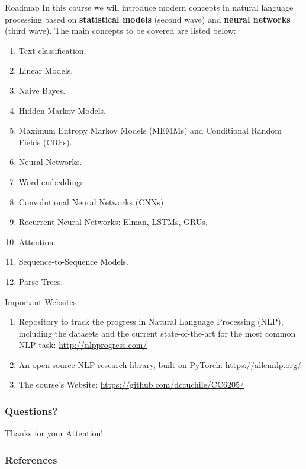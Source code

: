 \documentclass[handout]{beamer}
\begin{document}
\begin{frame}{Roadmap}
In this course we will introduce modern concepts in natural language processing based on \textbf{statistical models} (second wave) and \textbf{neural networks} (third wave). The main concepts to be covered are listed below:
\begin{scriptsize}
\begin{enumerate}
\item Text classification.
\item Linear Models.
\item Naive Bayes.
\item Hidden Markov Models.
\item Maximum Entropy Markov Models (MEMMs) and Conditional Random Fields (CRFs).
\item Neural Networks.
\item Word embeddings.
\item Convolutional Neural Networks (CNNs) 
\item Recurrent Neural Networks: Elman, LSTMs, GRUs. 
\item Attention.
\item Sequence-to-Sequence Models.
\item Parse Trees.
\end{enumerate} 
\end{scriptsize}
\end{frame}



\begin{frame}{Important Websites}

\begin{scriptsize}
\begin{enumerate}
\item Repository to track the progress in Natural Language Processing (NLP), including the datasets and the current state-of-the-art for the most common NLP task: \url{http://nlpprogress.com/}
\item An open-source NLP research library, built on PyTorch: \url{https://allennlp.org/}
\item The course's Website: \url{https://github.com/dccuchile/CC6205/}
\end{enumerate} 
\end{scriptsize}
\end{frame}




\begin{frame}
\frametitle{Questions?}
\begin{center}\LARGE Thanks for your Attention!\\ \end{center}



\end{frame}

\begin{frame}[allowframebreaks]\scriptsize
\frametitle{References}


%
\end{frame}  


\end{document}
